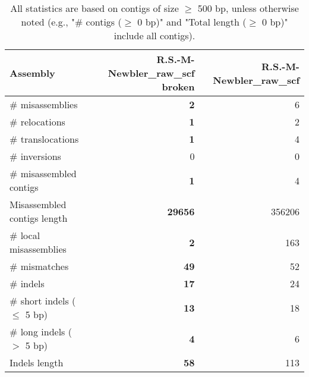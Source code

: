 \documentclass[12pt,a4paper]{article}
\begin{document}
\begin{table}[ht]
\begin{center}
\caption{All statistics are based on contigs of size $\geq$ 500 bp, unless otherwise noted (e.g., "\# contigs ($\geq$ 0 bp)" and "Total length ($\geq$ 0 bp)" include all contigs).}
\begin{tabular}{|l*{2}{|r}|}
\hline
Assembly & R.S.-M-Newbler\_raw\_scf broken & R.S.-M-Newbler\_raw\_scf \\ \hline
\# misassemblies & {\bf 2} & 6 \\ \hline
\hspace{5mm}\# relocations & {\bf 1} & 2 \\ \hline
\hspace{5mm}\# translocations & {\bf 1} & 4 \\ \hline
\hspace{5mm}\# inversions & 0 & 0 \\ \hline
\# misassembled contigs & {\bf 1} & 4 \\ \hline
Misassembled contigs length & {\bf 29656} & 356206 \\ \hline
\# local misassemblies & {\bf 2} & 163 \\ \hline
\# mismatches & {\bf 49} & 52 \\ \hline
\# indels & {\bf 17} & 24 \\ \hline
\hspace{5mm}\# short indels ($\leq$ 5 bp) & {\bf 13} & 18 \\ \hline
\hspace{5mm}\# long indels ($>$ 5 bp) & {\bf 4} & 6 \\ \hline
Indels length & {\bf 58} & 113 \\ \hline
\end{tabular}
\end{center}
\end{table}
\end{document}
